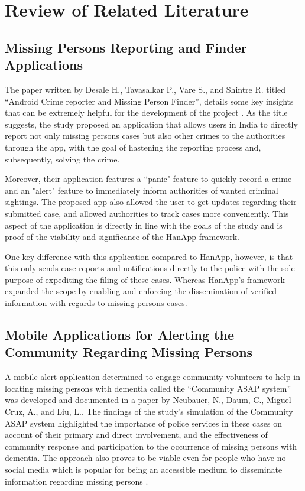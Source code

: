 \chapter{Review of Related Literature}
\label{sec:relatedlit}

\section{Missing Persons Reporting and Finder Applications}

The paper written by Desale H., Tavasalkar P., Vare S., and Shintre R. titled “Android Crime reporter and Missing Person Finder”, details some key insights that can be extremely helpful for the development of the project \cite{desale2020android}. As the title suggests, the study proposed an application that allows users in India to directly report not only missing persons cases but also other crimes to the authorities through the app, with the goal of hastening the reporting process and, subsequently, solving the crime. 

Moreover,  their application features a “panic" feature to quickly record a crime and an "alert" feature to immediately inform authorities of wanted criminal sightings. The proposed app also allowed the user to get updates regarding their submitted case, and allowed authorities to track cases more conveniently.  This aspect of the application is directly in line with the goals of the study and is proof of the viability and significance of the HanApp framework.

One key difference with this application compared to HanApp, however, is that this only sends case reports and notifications directly to the police with the sole purpose of expediting the filing of these cases. Whereas HanApp's framework expanded the scope by enabling and enforcing the dissemination of verified information with regards to missing persons cases.

\section{Mobile Applications for Alerting the Community Regarding Missing Persons}

A mobile alert application determined to engage community volunteers to help in locating missing persons with dementia called the “Community ASAP system” was developed and documented in a paper by Neubauer, N., Daum, C., Miguel-Cruz, A., and Liu, L.. The findings of the study’s simulation of the Community ASAP system highlighted the importance of police services in these cases on account of their primary and direct involvement, and the effectiveness of community response and participation to the occurrence of missing persons with dementia. The approach also proves to be viable even for people who have no social media which is popular for being an accessible medium to disseminate information regarding missing persons \cite{neubauer2021mobile}.

